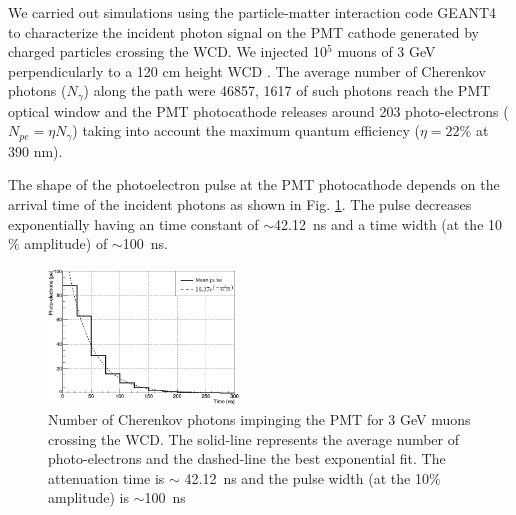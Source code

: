 \documentclass[letterpaper, 10 pt, conference]{ieeeconf}  %
\begin{document}
We carried out simulations using the particle-matter interaction code GEANT4 to characterize the incident photon signal on the PMT cathode generated by charged particles crossing the WCD. We injected 10$^5$ muons of 3 GeV perpendicularly to a 120 cm height WCD \cite{Vasquez2019, Caldern2015}. The average number of Cherenkov photons ($N_{\gamma}$) along the path were 46857, 1617 of such photons reach the PMT optical window and the PMT photocathode releases around 203 photo-electrons ($N_{pe} = \eta N_{\gamma}$) taking into account the maximum quantum efficiency ($\eta = 22 \%$ at 390 nm). 



The shape of the photoelectron pulse at the PMT photocathode depends on the arrival time of the incident photons as shown in Fig. \ref{pulse_G4}. The pulse decreases exponentially having an time constant of $\sim$42.12~ns and a time width (at the 10$\%$ amplitude) of $\sim$100~ns.\\

\begin{figure}[h!]
\begin{center}
\includegraphics[width=0.45\textwidth]{Figures/pulse_vem.png}
\caption{Number of Cherenkov photons impinging the PMT for 3 GeV muons crossing the WCD. The solid-line represents the average number of photo-electrons and the dashed-line the best exponential fit. The attenuation time is $\sim$ 42.12~ns and the pulse width (at the 10$\%$ amplitude) is $\sim$100~ns \cite{Vasquez2019}}
\label{pulse_G4}
\end{center}
\end{figure}

\end{document}
